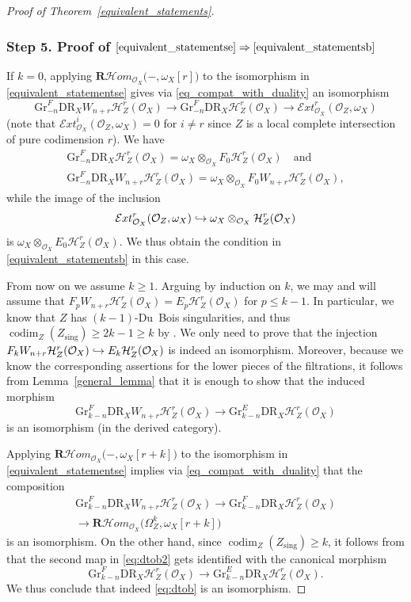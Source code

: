 \documentclass[11pt]{article}
\numberwithin{equation}{section}
\newcommand\hto{\mathrel{\lhook\joinrel\to}}
\theoremstyle{plain}
\theoremstyle{definition}
\newcommand\R{{\mathbf R}}
\newcommand\cH{\mathcal{H}}
\newcommand\cO{\mathcal{O}}
\newcommand\cH{\mathcal{H}}
\newcommand\cO{\mathcal{O}}
\newcommand\gr{\mathrm{Gr}}
\newcommand\DR{\mathrm{DR}}
\newcommand\sing{\mathrm{sing}}
\DeclareMathOperator{\codim}{codim}
\begin{document}
\begin{proof}[Proof of Theorem~\ref{equivalent_statements}]
\subsubsection*{Step 5. Proof of $\eqref{equivalent_statementse}\Rightarrow\eqref{equivalent_statementsb}$}
If $k=0$, applying $\R\cH om_{\cO_X}\big(-,\omega_X[r]\big)$ to the isomorphism in \eqref{equivalent_statementse} gives via \eqref{eq_compat_with_duality} an isomorphism\vspace*{-3pt}
\[\gr^F_{-n}\DR_XW_{n+r}\cH^r_Z(\cO_X)\to \gr^F_{-n}\DR_X\cH^r_Z(\cO_X)\to {\mathcal Ext}^r_{\cO_X}(\cO_Z,\omega_X)\]
(note that ${\mathcal Ext}^i_{\cO_X}(\cO_Z,\omega_X)=0$ for $i\neq r$ since $Z$ is a local complete intersection of pure codimension $r$).
We have
\begin{gather*}
\gr^F_{-n}\DR_X\cH^r_Z(\cO_X)=\omega_X\otimes_{\cO_X}F_0\cH^r_Z(\cO_X)\quad\text{and}\\
\gr^F_{-n}\DR_XW_{n+r}\cH^r_Z(\cO_X)=\omega_X\otimes_{\cO_X}F_0W_{n+r}\cH^r_Z(\cO_X),
\end{gather*}
while the image of the inclusion
\[
{\mathcal Ext}^r_{\cO_X}(\cO_Z,\omega_X)\hto \omega_X\otimes_{\cO_X}\cH^r_Z(\cO_X)
\]
is
$\omega_X\otimes_{\cO_X}E_0\cH^r_Z(\cO_X)$. We thus obtain the condition in \eqref{equivalent_statementsb} in this case.

From now on we assume $k\geq 1$. Arguing by induction on $k$, we may and will assume that
$F_pW_{n+r}\cH^r_Z(\cO_X)=E_p\cH^r_Z(\cO_X)$ for $p\leq k-1$. In particular, we know that $Z$ has $(k-1)$-Du~Bois singularities, and thus
$\codim_Z(Z_\sing)\geq 2k-1\geq k$ by \cite[Cor.\,3.40]{MP1}.
We only need to prove that the injection $F_{k}W_{n+r}\cH^r_Z(\cO_X) \hto E_{k}\cH^r_Z(\cO_X)$ is indeed an isomorphism.
Moreover, because we know the corresponding assertions for the lower pieces of the filtrations, it follows from Lemma~\ref{general_lemma}
that it is enough to show that the induced morphism
\begin{equation}\label{eq:dtob}
\gr^F_{k-n} \DR_X W_{n+r}\cH^r_Z(\cO_X)\to \gr^E_{k-n} \DR_X \cH^r_Z(\cO_X)
\end{equation}
is an isomorphism (in the derived category).

Applying $\R\cH om_{\cO_X}\big(-,\omega_X[r+k]\big)$ to the isomorphism in \eqref{equivalent_statementse} implies via \eqref{eq_compat_with_duality} that the composition
\begin{multline}\label{eq:dtob2}
\gr^F_{k-n}\DR_XW_{n+r}\cH^r_Z(\cO_X)\to \gr^F_{k-n}\DR_X\cH^r_Z(\cO_X)\\
\to \R\cH om_{\cO_X}(\Omega_Z^k,\omega_X[r+k]\big)
\end{multline}
is an isomorphism. On the other hand, since $\codim_Z(Z_\sing)\geq k$, it follows from
\cite[\S 5.2]{MP1}
that the second map in \eqref{eq:dtob2} gets identified with the canonical morphism
\[\gr^F_{k-n}\DR_X\cH^r_Z(\cO_X)\to \gr^E_{k-n}\DR_X\cH^r_Z(\cO_X).\]
We thus conclude that indeed \eqref{eq:dtob} is an isomorphism.


\end{proof}
\end{document}
